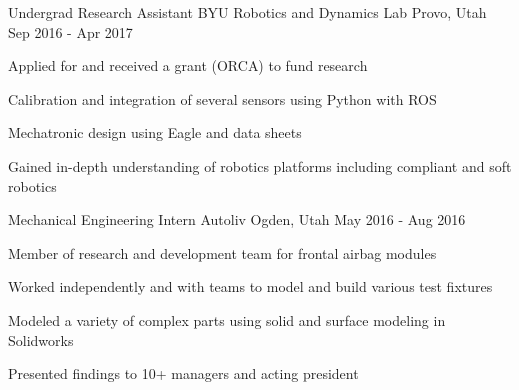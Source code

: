 \begin{cventries}
  \cventry
    {Undergrad Research Assistant} %
    {BYU Robotics and Dynamics Lab} %
    {Provo, Utah} %
    {Sep 2016 - Apr 2017} %
    {
      \begin{cvitems} %
        \item {Applied for and received a grant (ORCA) to fund research}
        \item {Calibration and integration of several sensors using Python with ROS}
        \item {Mechatronic design using Eagle and data sheets}
        \item {Gained in-depth understanding of robotics platforms including compliant and soft robotics}
      \end{cvitems}
    }


  \cventry
    {Mechanical Engineering Intern} %
    {Autoliv} %
    {Ogden, Utah} %
    {May 2016 - Aug 2016} %
    {
      \begin{cvitems} %
        \item {Member of research and development team for frontal airbag modules}
        \item {Worked independently and with teams to model and build various test fixtures}
        \item {Modeled a variety of complex parts using solid and surface modeling in Solidworks}
        \item {Presented findings to 10+ managers and acting president}
      \end{cvitems}
    }


\end{cventries}
